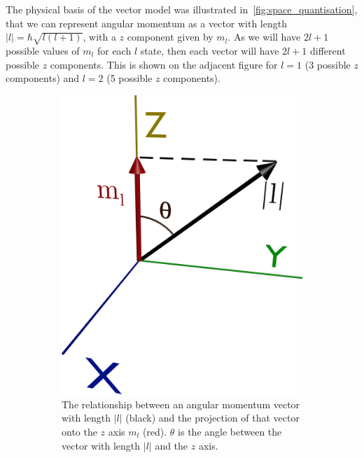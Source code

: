 \documentclass{memoir}[11pt,oneside,a4paper,openany]
\begin{document}
The physical basis of the vector model was illustrated in~\autoref{fig:space_quantisation}, that we can represent angular momentum as a vector with length $\lvert l \rvert = \hbar\sqrt{l(l+1)}$, with a $z$ component given by $m_l$. As we will have $2l+1$ possible values of $m_l$ for each $l$ state, then each vector will have $2l+1$ different possible $z$ components. This is shown on the adjacent figure for $l=1$ (3 possible $z$ components) and $l=2$ (5 possible $z$ components).  
\begin{figure}[h]
\centering
	\begin{subfigure}[b]{0.35\textwidth}
		\includegraphics[width=\textwidth]{space_quantisation}
		\caption{The relationship between an angular momentum vector with length $\lvert l \rvert$ (black) and the projection of that vector onto the $z$ axis $m_l$ (red). $\theta$ is the angle between the vector with length $\lvert l \rvert$ and the $z$ axis.}\label{fig:space_quantisation}
	\end{subfigure}
	\qquad
	\begin{subfigure}[b]{0.25\textwidth}

\end{subfigure}
\end{figure}
\end{document}
